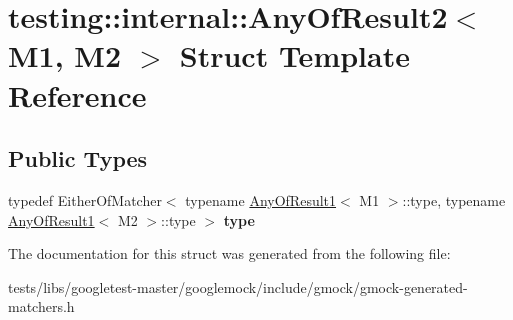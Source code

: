 \hypertarget{structtesting_1_1internal_1_1AnyOfResult2}{}\section{testing\+:\+:internal\+:\+:Any\+Of\+Result2$<$ M1, M2 $>$ Struct Template Reference}
\label{structtesting_1_1internal_1_1AnyOfResult2}
\subsection*{Public Types}
\begin{DoxyCompactItemize}
\item 
\mbox{\label{structtesting_1_1internal_1_1AnyOfResult2_a6d9eba508021f8e652c7c154a649073f}} 
typedef Either\+Of\+Matcher$<$ typename \hyperlink{structtesting_1_1internal_1_1AnyOfResult1}{Any\+Of\+Result1}$<$ M1 $>$\+::type, typename \hyperlink{structtesting_1_1internal_1_1AnyOfResult1}{Any\+Of\+Result1}$<$ M2 $>$\+::type $>$ {\bfseries type}
\end{DoxyCompactItemize}


The documentation for this struct was generated from the following file\+:\begin{DoxyCompactItemize}
\item 
tests/libs/googletest-\/master/googlemock/include/gmock/gmock-\/generated-\/matchers.\+h\end{DoxyCompactItemize}
